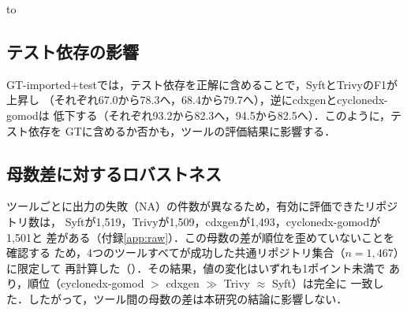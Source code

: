 \documentclass{css}
\begin{document}
\begin{table}[tb]
\caption{各ツールの精度（macro平均・name一致，all / imported /
imported+test，\%）}
\label{tab:result}
\hbox to
\end{table}

\subsection{テスト依存の影響}
GT-imported+testでは，テスト依存を正解に含めることで，SyftとTrivyのF1が上昇し
（それぞれ67.0から78.3へ，68.4から79.7へ），逆にcdxgenとcyclonedx-gomodは
低下する（それぞれ93.2から82.3へ，94.5から82.5へ）．このように，テスト依存を
GTに含めるか否かも，ツールの評価結果に影響する．

\subsection{母数差に対するロバストネス}
ツールごとに出力の失敗（NA）の件数が異なるため，有効に評価できたリポジトリ数は，
Syftが1{,}519，Trivyが1{,}509，cdxgenが1{,}493，cyclonedx-gomodが1{,}501と
差がある（付録\ref{app:raw}）．この母数の差が順位を歪めていないことを確認する
ため，4つのツールすべてが成功した共通リポジトリ集合（$n=1{,}467$）に限定して
再計算した（）．その結果，値の変化はいずれも1ポイント未満で
あり，順位（cyclonedx-gomod $>$ cdxgen $\gg$ Trivy $\approx$ Syft）は完全に
一致した．したがって，ツール間の母数の差は本研究の結論に影響しない．
\end{document}
